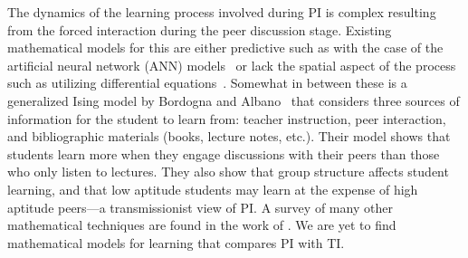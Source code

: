 \documentclass[twocolumn,secnumarabic,amssymb, nobibnotes, aps, prd]{revtex4-2}
\begin{document}
    The dynamics of the learning process involved during PI is complex resulting from the forced interaction during the peer discussion stage.
    Existing mathematical models for this are either predictive such as with the case of the artificial neural network (ANN) models~\cite{roxas2010seating} or lack the spatial aspect of the process such as utilizing differential equations~\cite{pritchard2008mathematical,nitta2019mathematical}.
    Somewhat in between these is a generalized Ising model by Bordogna and Albano~\cite{bordogna2001theoretical,bordogna2003simulation} that considers three sources of information for the student to learn from: teacher instruction, peer interaction, and bibliographic materials (books, lecture notes, etc.).
    Their model shows that students learn more when they engage discussions with their peers than those who only listen to lectures.
    They also show that group structure affects student learning, and that low aptitude students may learn at the expense of high aptitude peers---a transmissionist view of PI.
    A survey of many other mathematical techniques are found in the work of \citet{nitta2019mathematical}.
    We are yet to find mathematical models for learning that compares PI with TI.
    
\end{document}
